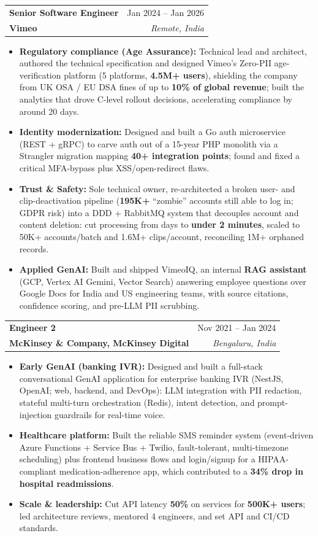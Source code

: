 \documentclass[letterpaper,10pt]{article}
\makeatletter
\newcommand{\resumeItem}[1]{\item\small{{#1 \vspace{-2pt}}}}
\newcommand{\resumeSubheading}[4]{
  \vspace{-1pt}\item
    \begin{tabular*}{0.99\textwidth}[t]{l@{\extracolsep{\fill}}r}
      \textbf{#1} & {\small #2} \\
      {\small\color{accent}\textbf{#3}} & \textit{\small #4} \\
    \end{tabular*}\vspace{-6pt}
}
\newcommand{\resumeItemListStart}{\begin{itemize}[itemsep=0pt, topsep=2pt, parsep=0pt, partopsep=0pt, leftmargin=0.18in]}
\newcommand{\resumeItemListEnd}{\end{itemize}\vspace{-4pt}}
\makeatother
\begin{document}
    \resumeSubheading
      {Senior Software Engineer}{Jan 2024 -- Jan 2026}
      {Vimeo}{Remote, India}
      \resumeItemListStart
        \resumeItem{\textbf{Regulatory compliance (Age Assurance):} Technical lead and architect, authored the technical specification and designed Vimeo's Zero-PII age-verification platform (5 platforms, \textbf{4.5M+ users}), shielding the company from UK OSA / EU DSA fines of up to \textbf{10\% of global revenue}; built the analytics that drove C-level rollout decisions, accelerating compliance by around 20 days.}
        \resumeItem{\textbf{Identity modernization:} Designed and built a Go auth microservice (REST + gRPC) to carve auth out of a 15-year PHP monolith via a Strangler migration mapping \textbf{40+ integration points}; found and fixed a critical MFA-bypass plus XSS/open-redirect flaws.}
        \resumeItem{\textbf{Trust \& Safety:} Sole technical owner, re-architected a broken user- and clip-deactivation pipeline (\textbf{195K+} ``zombie'' accounts still able to log in; GDPR risk) into a DDD + RabbitMQ system that decouples account and content deletion: cut processing from days to \textbf{under 2 minutes}, scaled to 50K+ accounts/batch and 1.6M+ clips/account, reconciling 1M+ orphaned records.}
        \resumeItem{\textbf{Applied GenAI:} Built and shipped VimeoIQ, an internal \textbf{RAG assistant} (GCP, Vertex AI Gemini, Vector Search) answering employee questions over Google Docs for India and US engineering teams, with source citations, confidence scoring, and pre-LLM PII scrubbing.}
      \resumeItemListEnd

    \resumeSubheading
      {Engineer 2}{Nov 2021 -- Jan 2024}
      {McKinsey \& Company, McKinsey Digital}{Bengaluru, India}
      \resumeItemListStart
        \resumeItem{\textbf{Early GenAI (banking IVR):} Designed and built a full-stack conversational GenAI application for enterprise banking IVR (NestJS, OpenAI; web, backend, and DevOps): LLM integration with PII redaction, stateful multi-turn orchestration (Redis), intent detection, and prompt-injection guardrails for real-time voice.}
        \resumeItem{\textbf{Healthcare platform:} Built the reliable SMS reminder system (event-driven Azure Functions + Service Bus + Twilio, fault-tolerant, multi-timezone scheduling) plus frontend business flows and login/signup for a HIPAA-compliant medication-adherence app, which contributed to a \textbf{34\% drop in hospital readmissions}.}
        \resumeItem{\textbf{Scale \& leadership:} Cut API latency \textbf{50\%} on services for \textbf{500K+ users}; led architecture reviews, mentored 4 engineers, and set API and CI/CD standards.}
      \resumeItemListEnd
\end{document}
